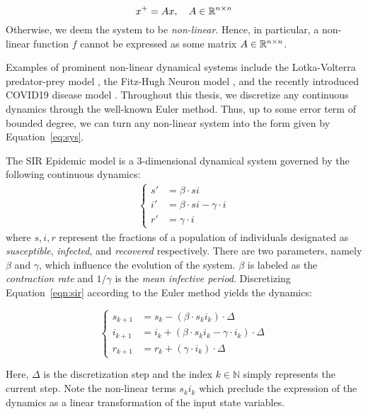 $$
x^{+} = Ax, \quad A \in {\mathbb{R}}^{n \times n}
$$
%
Otherwise, we deem the system to be \emph{non-linear}.
%
Hence, in particular, a non-linear function $f$ cannot be expressed as some matrix $A \in {\mathbb{R}}^{n \times n}$.

Examples of prominent non-linear dynamical systems include the Lotka-Volterra predator-prey model \cite{wangersky1978lotka}, the Fitz-Hugh Neuron model \cite{fitzhugh1961impulses}, and the recently introduced COVID19 disease model \cite{indiansuper2020supermodel}. Throughout this thesis, we discretize any continuous dynamics through the well-known Euler method. Thus, up to some error term of bounded degree, we can turn any non-linear system into the form given by Equation~\ref{eq:sys}.
%
\begin{example}
\label{ex:sir}
The SIR Epidemic model is a 3-dimensional dynamical system governed by the following continuous dynamics:
\begin{align} \label{eqn:sir}
    \begin{cases}
        s' &= \beta \cdot s i \\
        i' &= \beta \cdot s i - \gamma \cdot i \\
        r' &= \gamma \cdot i
    \end{cases}
\end{align}
where $s,i,r$ represent the fractions of a population of individuals designated as \textit{susceptible}, \textit{infected}, and \textit{recovered} respectively. There are two parameters, namely $\beta$ and $\gamma$, which influence the evolution of the system. $\beta$ is labeled as the \emph{contraction rate} and $1/\gamma$ is the \emph{mean infective period}.
%
Discretizing Equation~\ref{eqn:sir} according to the Euler method yields the dynamics:

\begin{center}
\label{fig:discrete_sir}
  \begin{equation*}
      \begin{cases}
          s_{k+1} &= s_k - (\beta \cdot s_k i_k)\cdot\Delta \\
          i_{k+1} &= i_k + (\beta \cdot s_k i_k - \gamma \cdot i_k)\cdot\Delta \\
          r_{k+1} &= r_k + (\gamma\cdot i_k)\cdot\Delta
      \end{cases}
  \end{equation*}
\end{center}
 Here, $\Delta$ is the discretization step and the index $k \in \mathbb{N}$ simply represents the current step.
%
Note the non-linear terms $s_ki_k$ which preclude the expression of the dynamics as a linear transformation of the input state variables.
\end{example}

